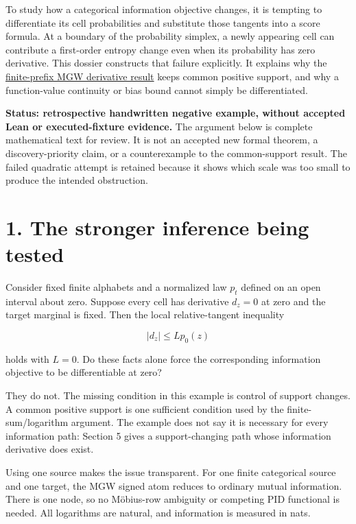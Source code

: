 \documentclass[11pt,a4paper]{article}
\title{\PidReportTitle{Zero cell tangents with a support-changing mutual-information cusp}{Handwritten negative example; formal verification remains open}}
\author{Sepehr Mahmoudian}
\date{}
\begin{document}
\PidMakeTitle
To study how a categorical information objective changes, it is tempting to differentiate its cell probabilities and substitute those tangents into a score formula. At a boundary of the probability simplex, a newly appearing cell can contribute a first-order entropy change even when its probability has zero derivative. This dossier constructs that failure explicitly. It explains why the \href{https://github.com/sepahead/pid-rs/blob/main/audit/research/finite-prefix-mgw-gradient/EXPOSITION.md}{finite-prefix MGW derivative result} keeps common positive support, and why a function-value continuity or bias bound cannot simply be differentiated.

\textbf{Status: retrospective handwritten negative example, without accepted Lean or executed-fixture evidence.} The argument below is complete mathematical text for review. It is not an accepted new formal theorem, a discovery-priority claim, or a counterexample to the common-support result. The failed quadratic attempt is retained because it shows which scale was too small to produce the intended obstruction.

\section{1. The stronger inference being tested}\label{the-stronger-inference-being-tested}

Consider fixed finite alphabets and a normalized law \(p_t\) defined on an open interval about zero. Suppose every cell has derivative \(d_z=0\) at zero and the target marginal is fixed. Then the local relative-tangent inequality

\[
|d_z|\le Lp_0(z)
\]

holds with \(L=0\). Do these facts alone force the corresponding information objective to be differentiable at zero?

They do not. The missing condition in this example is control of support changes. A common positive support is one sufficient condition used by the finite-sum/logarithm argument. The example does not say it is necessary for every information path: Section 5 gives a support-changing path whose information derivative does exist.

Using one source makes the issue transparent. For one finite categorical source and one target, the MGW signed atom reduces to ordinary mutual information. There is one node, so no Möbius-row ambiguity or competing PID functional is needed. All logarithms are natural, and information is measured in nats.
\end{document}
